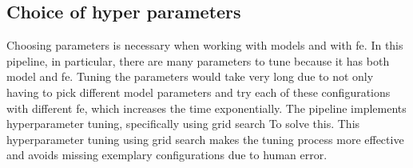 \subsection{Choice of hyper parameters}
Choosing parameters is necessary when working with models and with \gls{fe}. In this pipeline, in particular, there are many parameters to tune because it has both model and \gls{fe}. Tuning the parameters would take very long due to not only having to pick different model parameters and try each of these configurations with different \gls{fe}, which increases the time exponentially. The pipeline implements hyperparameter tuning, specifically using grid search To solve this. This hyperparameter tuning using grid search makes the tuning process more effective and avoids missing exemplary configurations due to human error.